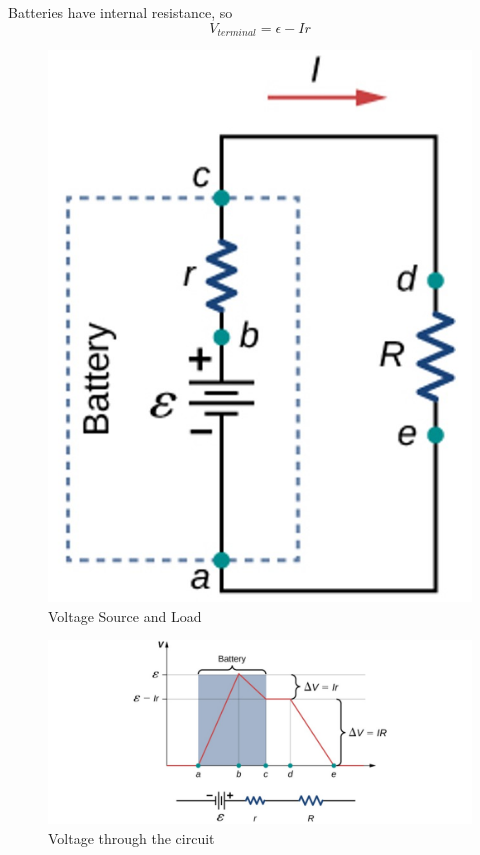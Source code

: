 \documentclass[14pt]{memoir}
\begin{document}
Batteries have internal resistance, so 
\begin{equation}
V_{terminal} = \epsilon - Ir
\end{equation}

\begin{figure}[H]
\begin{center}
\includegraphics[scale=0.50]{fig/fig_10_07.jpg}
\caption{Voltage Source and Load}
\label{fig:10_07}
\end{center}
\end{figure}

\begin{figure}[H]
\begin{center}
\includegraphics[scale=0.50]{fig/fig_10_08.jpg}
\caption{Voltage through the circuit}
\label{fig:10_08}
\end{center}
\end{figure}
\end{document}
